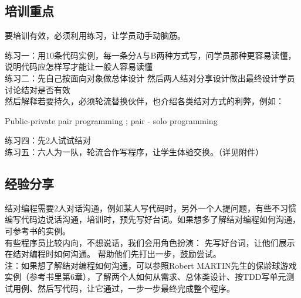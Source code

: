 \hypertarget{ux57f9ux8badux91cdux70b9}{%
\subsection{培训重点}\label{ux57f9ux8badux91cdux70b9}}

要培训有效，必须利用练习，让学员动手动脑筋。


练习一：用10条代码实例，每一条分A与B两种方式写，问学员那种更容易读懂，说明代码应怎样写才能让一般人容易读懂\\
练习二：先自己按面向对象做总体设计
然后两人结对分享设计做出最终设计学员讨论结对是否有效\\
然后解释若要持久，必须轮流替换伙伴，也介绍各类结对方式的利弊，例如：

\begin{description}
\tightlist
\item[]
Public-private pair programming ; pair - solo programming
\end{description}

练习四：先2人试试结对\\
练习五：六人为一队，轮流合作写程序，让学生体验交换。（详见附件）\\

\hypertarget{ux7ecfux9a8cux5206ux4eab}{%
\subsection{经验分享}\label{ux7ecfux9a8cux5206ux4eab}}

结对编程需要2人对话沟通，例如某人写代码时，另外一个人提问题，有些不习惯编写代码边说话沟通，培训时，预先写好台词。如果想多了解结对编程如何沟通，可参考书的实例。\\
有些程序员比较内向，不想说话，我们会用角色扮演：
先写好台词，让他们展示在结对编程时如何沟通。
帮助他们先打出一步，鼓励尝试。\\
注：如果想了解结对编程如何沟通，可以参照Robert
MARTIN先生的保龄球游戏实例（参考书里第6章），了解两个人如何从需求、总体类设计、按TDD写单元测试用例、然后写代码，让它通过，一步一步最终完成整个程序。\\

